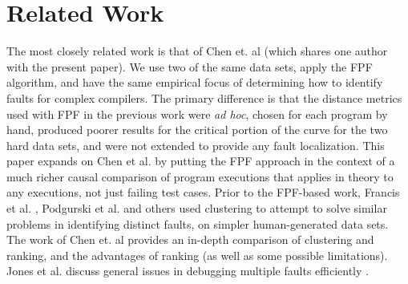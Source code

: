 \section{Related Work}
\label{sec:related}

 
The most closely related work is that of Chen et. al \cite{PLDI13} (which shares one author with the present paper).  We use two of the same data sets, apply the FPF \cite{Gonzalez} algorithm, and have the same empirical focus of determining how to identify faults for complex compilers.  The primary difference is that the distance metrics used with FPF in the previous work were \emph{ad hoc}, chosen for each program by hand, produced poorer results for the critical portion of the curve for the two hard data sets, and were not extended to provide any fault localization.  This paper expands on Chen et al. by putting the FPF approach in the context of a much richer causal comparison of program executions that applies in theory to any executions, not just failing test cases.  Prior to the FPF-based work, Francis et al. \cite{Podgurski04}, Podgurski et al. \cite{Podgurski03} and others \cite{Liu06,Liblit05} used clustering to attempt to solve similar problems in identifying distinct faults, on simpler human-generated data sets.  The work of Chen et. al \cite{PLDI13} provides an in-depth comparison of clustering and ranking, and the advantages of ranking (as well as some possible limitations).  Jones et al. discuss general issues in debugging multiple faults efficiently \cite{Jones07}.

